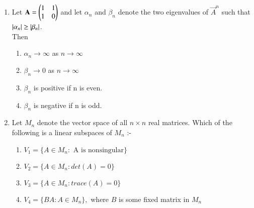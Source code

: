 \begin{enumerate}[label=\thesection.\arabic*.,ref=\thesection.\theenumi]
\item %
Let $\mathbf{A}=\begin{pmatrix}1 & 1\\1 & 0\end{pmatrix}$ and let $\alpha_n$ and $\beta_n$ denote the two eigenvalues of $\vec{A}^n$ such that $\left\vert\alpha_n\right\vert\geq\left\vert\beta_n\right\vert$.\\
Then
\begin{enumerate}
    \item $\alpha_n\rightarrow \infty$ as $n\rightarrow \infty$
    \item $\beta_n\rightarrow 0$ as $n\rightarrow \infty$
    \item $\beta_n$ is positive if n is even.
    \item $\beta_n$ is negative if n is odd.
\end{enumerate}
%
\solution

\item Let $M_n$ denote the vector space of all $n\times n$ real matrices. Which of the following is a linear subspaces of $M_n$ :-
\begin{enumerate}
\item $ V_1 = \{  A \in M_n : \text{ A is nonsingular} \}$
\item $ V_2 = \{  A \in M_n : det(A) = 0 \}$
\item $ V_3 = \{  A \in M_n : trace(A) = 0 \}$
\item $ V_4 = \{  BA : A \in M_n\},$ where $ B$ is some fixed matrix in $ M_n$
\end{enumerate}
%
\solution



\end{enumerate}
